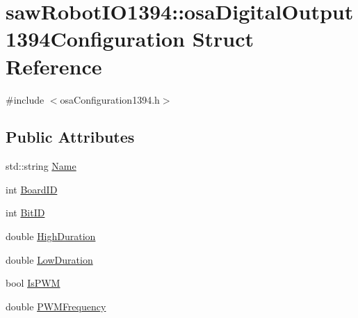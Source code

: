 \hypertarget{structsaw_robot_i_o1394_1_1osa_digital_output1394_configuration}{\section{saw\-Robot\-I\-O1394\-:\-:osa\-Digital\-Output1394\-Configuration Struct Reference}
\label{structsaw_robot_i_o1394_1_1osa_digital_output1394_configuration}
}


{\ttfamily \#include $<$osa\-Configuration1394.\-h$>$}

\subsection*{Public Attributes}
\begin{DoxyCompactItemize}
\item 
std\-::string \hyperlink{structsaw_robot_i_o1394_1_1osa_digital_output1394_configuration_a52e037cdee9d74d778d84ddbc6ac8ce6}{Name}
\item 
int \hyperlink{structsaw_robot_i_o1394_1_1osa_digital_output1394_configuration_afacd5d5974cdec222d70f38dd09b370a}{Board\-I\-D}
\item 
int \hyperlink{structsaw_robot_i_o1394_1_1osa_digital_output1394_configuration_aa1c825cfeebda7f2aa923138b00f323b}{Bit\-I\-D}
\item 
double \hyperlink{structsaw_robot_i_o1394_1_1osa_digital_output1394_configuration_a459290d06df9180fb6ba0294f216c02f}{High\-Duration}
\item 
double \hyperlink{structsaw_robot_i_o1394_1_1osa_digital_output1394_configuration_acda561b149525f98b7fecbfafda308f9}{Low\-Duration}
\item 
bool \hyperlink{structsaw_robot_i_o1394_1_1osa_digital_output1394_configuration_aa7776dc4be860f1f4ecaad3c45a60ede}{Is\-P\-W\-M}
\item 
double \hyperlink{structsaw_robot_i_o1394_1_1osa_digital_output1394_configuration_a30e1300d95b514db6b6c92478d8a8dd3}{P\-W\-M\-Frequency}
\end{DoxyCompactItemize}


